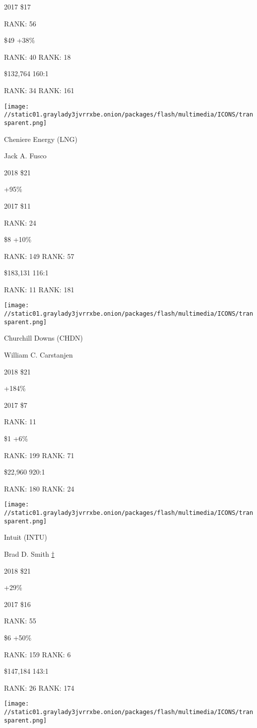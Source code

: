 2017 \$17

RANK: 56

 \$49 +38\%

RANK: 40 RANK: 18

 \$132,764 160:1

RANK: 34 RANK: 161

\texttt{[image: //static01.graylady3jvrrxbe.onion/packages/flash/multimedia/ICONS/transparent.png]}

Cheniere Energy (LNG)

Jack A. Fusco \protect\hyperlink{g-footnotes}{}

2018 \$21

 +95\%

2017 \$11

RANK: 24

 \$8 +10\%

RANK: 149 RANK: 57

 \$183,131 116:1

RANK: 11 RANK: 181

\texttt{[image: //static01.graylady3jvrrxbe.onion/packages/flash/multimedia/ICONS/transparent.png]}

Churchill Downs (CHDN)

William C. Carstanjen \protect\hyperlink{g-footnotes}{}

2018 \$21

 +184\%

2017 \$7

RANK: 11

 \$1 +6\%

RANK: 199 RANK: 71

 \$22,960 920:1

RANK: 180 RANK: 24

\texttt{[image: //static01.graylady3jvrrxbe.onion/packages/flash/multimedia/ICONS/transparent.png]}

Intuit (INTU)

Brad D. Smith \protect\hyperlink{g-footnotes}{†}

2018 \$21

 +29\%

2017 \$16

RANK: 55

 \$6 +50\%

RANK: 159 RANK: 6

 \$147,184 143:1

RANK: 26 RANK: 174

\texttt{[image: //static01.graylady3jvrrxbe.onion/packages/flash/multimedia/ICONS/transparent.png]}

